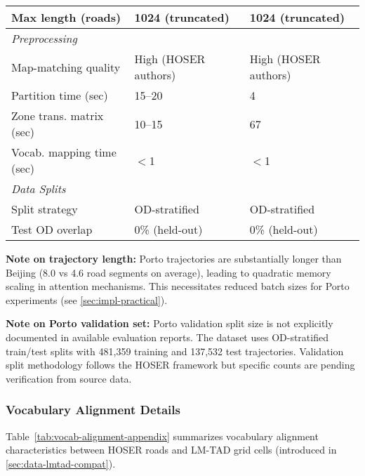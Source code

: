 \begin{table}[H]
\begin{tabular}{lll}
        \quad Max length (roads)        & 1024 (truncated)        & 1024 (truncated)      \\
        \midrule
        \multicolumn{3}{l}{\textit{Preprocessing}}                                   \\
        \quad Map-matching quality      & High (HOSER authors)    & High (HOSER authors)  \\
        \quad Partition time (sec)      & 15--20                  & 4                     \\
        \quad Zone trans. matrix (sec)  & 10--15                  & 67                    \\
        \quad Vocab. mapping time (sec) & $<$1                    & $<$1                  \\
        \midrule
        \multicolumn{3}{l}{\textit{Data Splits}}                                     \\
        \quad Split strategy            & OD-stratified           & OD-stratified         \\
        \quad Test OD overlap           & 0\% (held-out)          & 0\% (held-out)        \\
        \bottomrule
    \end{tabular}
\end{table}

\textbf{Note on trajectory length:} Porto trajectories are substantially longer than Beijing (8.0 vs 4.6 road segments on average), leading to quadratic memory scaling in attention mechanisms. This necessitates reduced batch sizes for Porto experiments (see \autoref{sec:impl-practical}).

\textbf{Note on Porto validation set:} Porto validation split size is not explicitly documented in available evaluation reports. The dataset uses OD-stratified train/test splits with 481,359 training and 137,532 test trajectories. Validation split methodology follows the HOSER framework but specific counts are pending verification from source data.

\subsubsection{Vocabulary Alignment Details}
\label{app:vocab-stats}

Table~\ref{tab:vocab-alignment-appendix} summarizes vocabulary alignment characteristics between HOSER roads and LM-TAD grid cells (introduced in \autoref{sec:data-lmtad-compat}).

